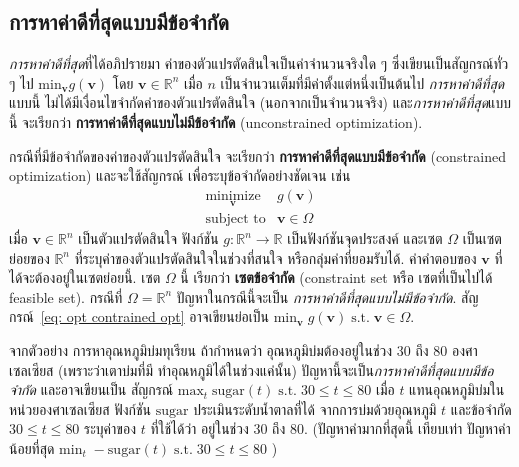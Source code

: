 \subsection{การหาค่าดีที่สุดแบบมีข้อจำกัด}
\label{sec: opt contrained opt}

\textit{การหาค่าดีที่สุด}ที่ได้อภิปรายมา
ค่าของตัวแปรตัดสินใจเป็นค่าจำนวนจริงใด ๆ
ซึ่งเขียนเป็นสัญกรณ์ทั่ว ๆ ไป $\mathrm{min}_{\bm{v}} g(\bm{v})$ โดย $\bm{v} \in \mathbb{R}^n$ เมื่อ $n$ เป็นจำนวนเต็มที่มีค่าตั้งแต่หนึ่งเป็นต้นไป
\textit{การหาค่าดีที่สุด}แบบนี้ 
ไม่ได้มีเงื่อนไขจำกัดค่าของตัวแปรตัดสินใจ (นอกจากเป็นจำนวนจริง)
และ\textit{การหาค่าดีที่สุด}แบบนี้ จะเรียกว่า
\textbf{การหาค่าดีที่สุดแบบไม่มีข้อจำกัด} (unconstrained optimization).

กรณีที่มีข้อจำกัดของค่าของตัวแปรตัดสินใจ
จะเรียกว่า
\textbf{การหาค่าดีที่สุดแบบมีข้อจำกัด} (constrained optimization)
และจะใช้สัญกรณ์ เพื่อระบุข้อจำกัดอย่างชัดเจน เช่น
\begin{eqnarray}
\underset{\bm{v}}{\mathrm{minimize}} & g(\bm{v})
\nonumber \\
\mbox{subject to} & \bm{v} \in \Omega 
\label{eq: opt contrained opt}
\end{eqnarray}
เมื่อ $\bm{v} \in \mathbb{R}^n$ เป็นตัวแปรตัดสินใจ
ฟังก์ชัน $g: \mathbb{R}^n \rightarrow \mathbb{R}$ เป็นฟังก์ชันจุดประสงค์
และเซต $\Omega$ เป็นเซตย่อยของ $\mathbb{R}^n$ ที่ระบุค่าของตัวแปรตัดสินใจในช่วงที่สนใจ หรือกลุ่มค่าที่ยอมรับได้.
ค่าคำตอบของ $\bm{v}$ ที่ได้จะต้องอยู่ในเซตย่อยนี้.
เซต $\Omega$ นี้ เรียกว่า \textbf{เซตข้อจำกัด} (constraint set หรือ เซตที่เป็นไปได้ feasible set).
กรณีที่ $\Omega = \mathbb{R}^n$
ปัญหาในกรณีนี้จะเป็น
\textit{การหาค่าดีที่สุดแบบไม่มีข้อจำกัด}.
สัญกรณ์~\ref{eq: opt contrained opt} อาจเขียนย่อเป็น $\mathrm{min}_{\bm{v}} \; g(\bm{v}) \; \mbox{s.t.} \; \bm{v} \in \Omega$.

จากตัวอย่าง การหาอุณหภูมิบ่มทุเรียน ถ้ากำหนดว่า อุณหภูมิบ่มต้องอยู่ในช่วง $30$ ถึง $80$ องศาเซลเซียส (เพราะว่าเตาบ่มที่มี ทำอุณหภูมิได้ในช่วงแค่นั้น)
ปัญหานี้จะเป็น\textit{การหาค่าดีที่สุดแบบมีข้อจำกัด}
และอาจเขียนเป็น สัญกรณ์ $\mathrm{max}_t \; \mathrm{sugar}(t) \; \mbox{s.t.} \; 30 \leq t \leq 80$
เมื่อ $t$ แทนอุณหภูมิบ่มในหน่วยองศาเซลเซียส
ฟังก์ชัน $\mathrm{sugar}$ ประเมินระดับน้ำตาลที่ได้ จากการบ่มด้วยอุณหภูมิ $t$
และข้อจำกัด $30 \leq t \leq 80$ ระบุค่าของ $t$ ที่ใช้ได้ว่า อยู่ในช่วง $30$ ถึง $80$.
(ปัญหาค่ามากที่สุดนี้ เทียบเท่า
ปัญหาค่าน้อยที่สุด
$\mathrm{min}_t \; -\mathrm{sugar}(t) \; \mbox{s.t.} \; 30 \leq t \leq 80$
)

